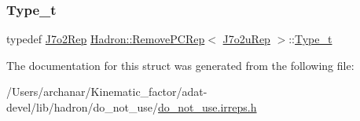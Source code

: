 \mbox{\label{structHadron_1_1RemovePCRep_3_01J7o2uRep_01_4_a41f9fc887bdc034a1a02ac22a5521c00}} 
\subsubsection{\texorpdfstring{Type\_t}{Type\_t}\hspace{0.1cm}{\footnotesize\ttfamily [2/2]}}
{\footnotesize\ttfamily typedef \mbox{\hyperlink{structHadron_1_1J7o2Rep}{J7o2\+Rep}} \mbox{\hyperlink{structHadron_1_1RemovePCRep}{Hadron\+::\+Remove\+P\+C\+Rep}}$<$ \mbox{\hyperlink{structHadron_1_1J7o2uRep}{J7o2u\+Rep}} $>$\+::\mbox{\hyperlink{structHadron_1_1RemovePCRep_3_01J7o2uRep_01_4_a41f9fc887bdc034a1a02ac22a5521c00}{Type\+\_\+t}}}



The documentation for this struct was generated from the following file\+:\begin{DoxyCompactItemize}
\item 
/\+Users/archanar/\+Kinematic\+\_\+factor/adat-\/devel/lib/hadron/do\+\_\+not\+\_\+use/\mbox{\hyperlink{adat-devel_2lib_2hadron_2do__not__use_2do__not__use_8irreps_8h}{do\+\_\+not\+\_\+use.\+irreps.\+h}}\end{DoxyCompactItemize}
